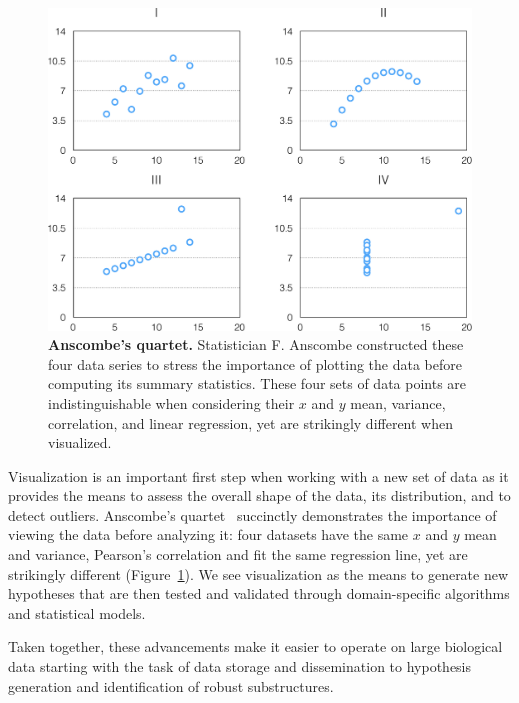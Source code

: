 \begin{figure}[ht]
  \centering
  \includegraphics[width=0.8\linewidth]{figures/anscombes_quartet}
  \caption{\textbf{Anscombe's quartet.} Statistician F. Anscombe constructed these four data series to stress the importance of plotting the data before computing its summary statistics. These four sets of data points are indistinguishable when considering their $x$ and $y$ mean, variance, correlation, and linear regression, yet are strikingly different when visualized.}
  \label{fig:intro:anscombe}
\end{figure}


Visualization is an important first step when working with a new set of data as it provides the means to assess the overall shape of the data, its distribution, and to detect outliers. Anscombe's quartet~\cite{anscombe} succinctly demonstrates the importance of viewing the data before analyzing it: four datasets have the same $x$ and $y$ mean and variance, Pearson's correlation and fit the same regression line, yet are strikingly different (Figure~\ref{fig:intro:anscombe}). We see visualization as the means to generate new hypotheses that are then tested and validated through domain-specific algorithms and statistical models.

Taken together, these advancements make it easier to operate on large biological data starting with the task of data storage and dissemination to hypothesis generation and identification of robust substructures.